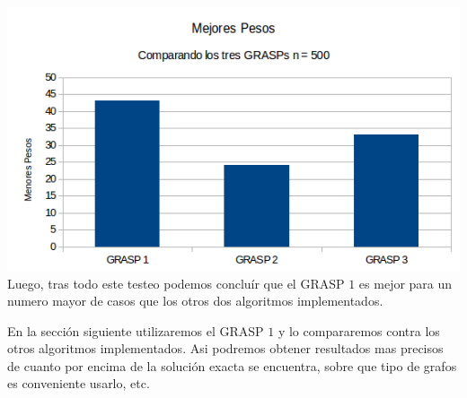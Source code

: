 \includegraphics[scale=0.7]{Ej5/CompetenciaGRASPs3.png}\\

Luego, tras todo este testeo podemos concluír que el GRASP $1$ es mejor para un numero mayor de casos que los otros dos algoritmos implementados.

En la sección siguiente utilizaremos el GRASP $1$ y lo compararemos contra los otros algoritmos implementados. Asi podremos obtener resultados mas precisos de cuanto por encima de la solución exacta se encuentra, sobre que tipo de grafos es conveniente usarlo, etc.